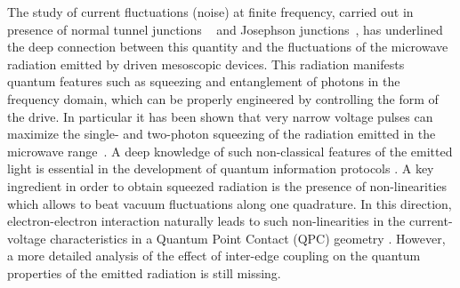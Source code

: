 \documentclass[12pt]{iopart}
\begin{document}
The study of current fluctuations (noise) at finite frequency, carried out in presence of normal tunnel junctions ~\cite{Gasse13, Forgues15, Forgues16} and Josephson junctions~\cite{Westig17}, has underlined the deep connection between this quantity and the fluctuations of the microwave radiation emitted by driven mesoscopic devices. This radiation manifests quantum features such as squeezing and entanglement of photons in the frequency domain, which can be properly engineered by controlling the form of the drive. In particular it has been shown that very narrow voltage pulses can maximize the single- and two-photon squeezing of the radiation emitted in the microwave range~\cite{Mendes15, Ferraro18}. A deep knowledge of such non-classical features of the emitted light is essential in the development of quantum information protocols \cite{Braunstein05}. A key ingredient in order to obtain squeezed radiation is the presence of non-linearities which allows to beat vacuum fluctuations along one quadrature. 
In this direction, electron-electron interaction naturally leads to such non-linearities in the current-voltage characteristics in a Quantum Point Contact (QPC) geometry \cite{Sassetti96, Ferraro10, Dolcetto16, Ronetti17}. However, a more detailed analysis of the effect of inter-edge coupling on the quantum properties of the emitted radiation is still missing.\\
\end{document}
